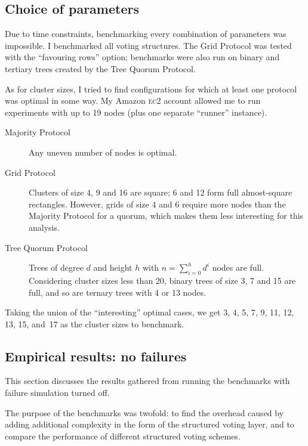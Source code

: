 \documentclass[12pt,chapterprefix=true,toc=bibliography,numbers=noendperiod,
               footnotes=multiple,twoside]{scrreprt}
\newcommand{\ECC}[0]{\textsc{ec}2 }
\begin{document}
\subsection{Choice of parameters}

Due to time constraints, benchmarking every combination of parameters was impossible. I benchmarked all voting structures. The Grid Protocol was tested with the \enquote{favouring rows} option; benchmarks were also run on binary and tertiary trees created by the Tree Quorum Protocol.

As for cluster sizes, I tried to find configurations for which at least one protocol was optimal in some way. My Amazon \ECC account allowed me to run experiments with up to 19 nodes (plus one separate \enquote{runner} instance).

\begin{description}
    \item[Majority Protocol] Any uneven number of nodes is optimal.
    \item[Grid Protocol] Clusters of size 4, 9 and 16 are square; 6 and 12 form full almost-square rectangles. However, grids of size 4 and 6 require more nodes than the Majority Protocol for a quorum, which makes them less interesting for this analysis.
    \item[Tree Quorum Protocol] Trees of degree \(d\) and height \(h\) with \(n = \sum^h_{i=0} d^i\) nodes are full. Considering cluster sizes less than 20, binary trees of size 3, 7 and 15 are full, and so are ternary trees with 4 or 13 nodes.
\end{description}

Taking the union of the \enquote{interesting} optimal cases, we get 3, 4, 5, 7, 9, 11, 12, 13, 15, and~17 as the cluster sizes to benchmark.

\subsection{Empirical results: no failures}
\label{ssc:results}

This section discusses the results gathered from running the benchmarks with failure simulation turned off.

The purpose of the benchmarks was twofold: to find the overhead caused by adding additional complexity in the form of the structured voting layer, and to compare the performance of different structured voting schemes.

\end{document}
